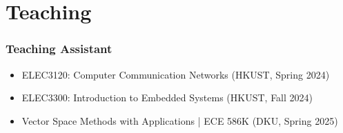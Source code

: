 \documentclass[10pt,a4paper]{article}
\begin{document}
\section*{\color{sectioncolor}Teaching}
    \subsubsection*{\color{itemcolor}Teaching Assistant}
    \begin{itemize}[leftmargin=*, label=\textcolor{accentcolor}{\textbullet}]
        \item ELEC3120: Computer Communication Networks (HKUST, Spring 2024)
        \item ELEC3300: Introduction to Embedded Systems (HKUST, Fall 2024)
        \item Vector Space Methods with Applications | ECE 586K (DKU, Spring 2025)
    \end{itemize}



\end{document}
